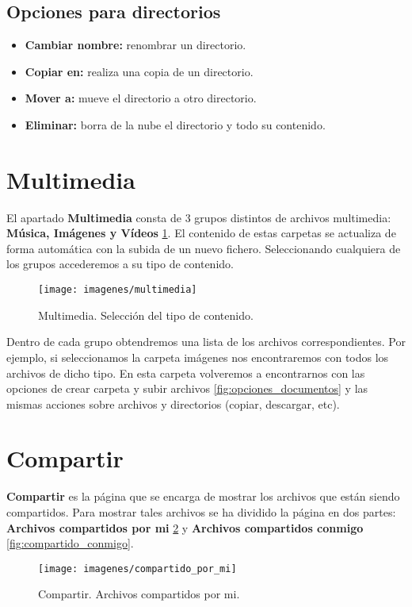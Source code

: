 \subsection{Opciones para directorios}
\begin{itemize}
	\item \textbf{Cambiar nombre:} renombrar un directorio.
	\item \textbf{Copiar en:} realiza una copia de un directorio.
	\item \textbf{Mover a:} mueve el directorio a otro directorio.
	\item \textbf{Eliminar:} borra de la nube el directorio y todo su contenido.
\end{itemize}

\section{Multimedia}
El apartado \textbf{Multimedia} consta de 3 grupos distintos de archivos multimedia: \textbf{Música, Imágenes y Vídeos} \ref{fig:multimedia}. El contenido de estas carpetas se actualiza de forma automática con la subida de un nuevo fichero. Seleccionando cualquiera de los grupos accederemos a su tipo de contenido.

\begin{figure}[H]
	\centering
	\texttt{[image: imagenes/multimedia]}
	\caption{Multimedia. Selección del tipo de contenido.}
	\label{fig:multimedia}
\end{figure}

Dentro de cada grupo obtendremos una lista de los archivos correspondientes. Por ejemplo, si seleccionamos la carpeta imágenes nos encontraremos con todos los archivos de dicho tipo. En esta carpeta volveremos a encontrarnos con las opciones de crear carpeta y subir archivos \ref{fig:opciones_documentos} y las mismas acciones sobre archivos y directorios (copiar, descargar, etc).

\section{Compartir}
\textbf{Compartir} es la página que se encarga de mostrar los archivos que están siendo compartidos. Para mostrar tales archivos se ha dividido la página en dos partes: \textbf{Archivos compartidos por mi} \ref{fig:compartido_por_mi} y \textbf{Archivos compartidos conmigo} \ref{fig:compartido_conmigo}.

\begin{figure}[H]
	\centering
	\texttt{[image: imagenes/compartido\_por\_mi]}
	\caption{Compartir. Archivos compartidos por mi.}
	\label{fig:compartido_por_mi}
\end{figure}

